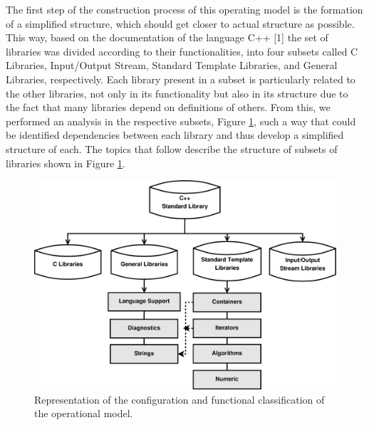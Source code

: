 \documentclass[a4paper]{llncs}
\begin{document}
The first step of the construction process of this operating model is the formation of a simplified structure,
which should get closer to actual structure as possible. This way, based on the documentation of the language C++
[1] the set of libraries was divided according to their functionalities, into four subsets called C Libraries,
Input/Output Stream, Standard Template Libraries, and General Libraries, respectively. Each library present in a
subset is particularly related to the other libraries, not only in its functionality but also in its structure due
to the fact that many libraries depend on definitions of others. From this, we performed an analysis in the respective 
subsets, Figure \ref{figure:cpp-diagram}, such a way that could be identified dependencies between each library and thus develop a simplified 
structure of each. The topics that follow describe the structure of subsets of libraries shown in Figure \ref{figure:cpp-diagram}.
%
\begin{figure}[ht]
\centering
\includegraphics[scale=0.28]{figures/diagramascpp.eps}
\caption{Representation of the configuration and functional classification of the operational model.}
\label{figure:cpp-diagram}
\end{figure}
\end{document}
